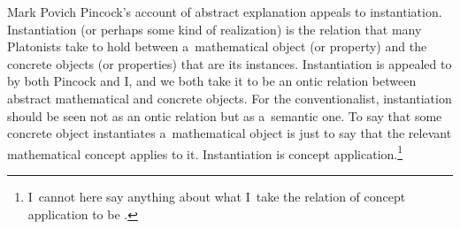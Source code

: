 \begin{artengenv}{Mark Povich}
Pincock's account of abstract explanation appeals to instantiation. Instantiation (or perhaps some kind of realization) is the relation that many Platonists take to hold between a~mathematical object (or property) and the concrete objects (or properties) that are its instances. Instantiation is appealed to by both Pincock and I, and we both take it to be an ontic relation between abstract mathematical and concrete objects. For the conventionalist, instantiation should be seen not as an ontic relation but as a~semantic one. To say that some concrete object instantiates a~mathematical object is just to say that the relevant mathematical concept applies to it. Instantiation is concept application.\footnote{I~cannot here say anything about what I~take the relation of concept application to be
\parencite[though I~am sympathetic to][]{thomasson_ordinary_2007}. %
}
\end{artengenv}
